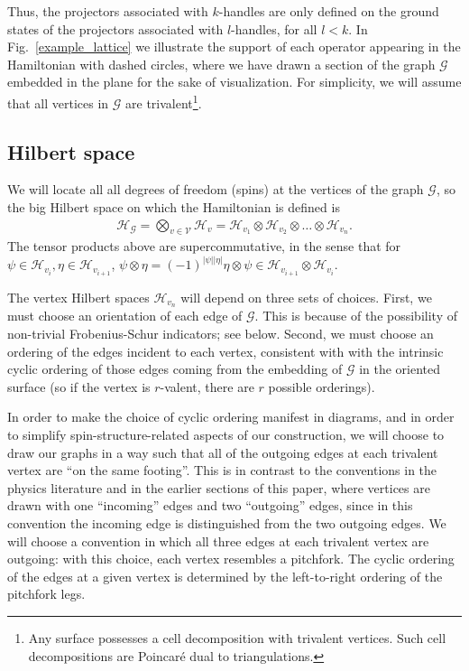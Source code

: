 \documentclass[12pt,a4paper]{article}
\newcommand{\tp}{\otimes}
\newcommand{\mcg}{\mathcal{G}}
\newcommand{\mch}{\mathcal{H}}
\newcommand{\mcv}{\mathcal{V}}
\newcommand{\kw}[1]{{\color{kwcolor}\footnotesize{(KW) #1}}}
\newcommand{\dave}[1]{{\color{ao(english)}\footnotesize{(DA) #1}}}
\newcommand{\ethan}[1]{{\color{amethyst}\footnotesize{(EL) #1}}}
\begin{document}
Thus, the projectors associated with $k$-handles are only defined on the ground states of the projectors associated with $l$-handles, for all $l<k$.  
In Fig.~\ref{example_lattice} we illustrate the support of each operator appearing in the Hamiltonian with dashed circles, where we have drawn a section of the graph $\mcg$ embedded in the plane for the sake of visualization. 
For simplicity, we will assume that all vertices in $\mcg$ are trivalent\footnote{Any surface possesses a cell decomposition with trivalent vertices.
Such cell decompositions are Poincar\'e dual to triangulations.}.




\subsection{Hilbert space} \label{hilbertspacesect}

We will locate all all degrees of freedom (spins) at the vertices of the graph $\mcg$, so
the big Hilbert space on which the Hamiltonian is defined is
\begin{align}	\label{GraphHilbertSpace}
 \mch_\mcg =\bigotimes_{v \in \mcv} \mch_v  = \mch_{v_1} \tp \mch_{v_{2}} \tp \dots \tp \mch_{v_n} .
\end{align}
The tensor products above are supercommutative, in the sense that for $\psi\in \mch_{v_i},\eta\in \mch_{v_{i+1}}$, $\psi \tp \eta = (-1)^{|\psi||\eta|}\eta\tp\psi \in \mch_{v_{i+1}} \tp \mch_{v_i}$. 

The vertex Hilbert spaces $\mch_{v_n}$ will depend on three sets of choices.
First, we must choose an orientation of each edge of $\mcg$.
This is because of the possibility of non-trivial Frobenius-Schur indicators; see below.
Second, we must choose an ordering of the edges incident to each vertex, consistent with with the intrinsic cyclic ordering of those edges
coming from the embedding of $\mcg$ in the oriented surface
(so if the vertex is $r$-valent, there are $r$ possible orderings).

In order to make the choice of cyclic ordering manifest in diagrams, and in order to simplify spin-structure-related
aspects of our construction, we will choose to draw our graphs in a way such that all of the outgoing 
edges at each trivalent vertex are ``on the same footing''. This is in contrast to the conventions in the physics literature
and in the earlier sections of this paper, where vertices are drawn with one ``incoming'' edges and two 
``outgoing'' edges, since in this convention the incoming edge is distinguished from the two outgoing edges.
We will choose a convention in which all three edges at each trivalent vertex are outgoing: with this
choice, each vertex resembles a pitchfork. 
The cyclic ordering of the edges at a given vertex is determined by the left-to-right ordering of the pitchfork legs. 
\end{document}
